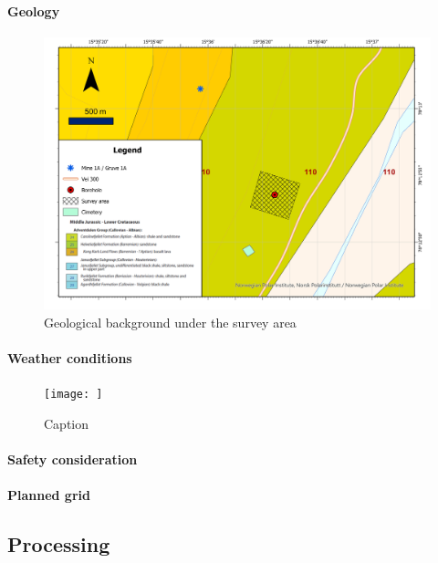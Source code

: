 \paragraph{Geology}

\begin{figure} [H]
    \centering
    \includegraphics[width=\linewidth]{Images/00_Methodology/GeologicalSituationMap.jpg}
    \caption{Geological background under the survey area \cite{Atakan2015GeoscienceSvalbard}}
    \label{fig:GeologicalBackground}
\end{figure}

\paragraph{Weather conditions}

\begin{figure}
    \centering
    \texttt{[image: ]}
    \caption{Caption}
    \label{fig:my_label}
\end{figure}

\paragraph{Safety consideration}

\paragraph{Planned grid}


\subsection{Processing}